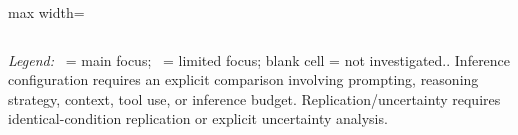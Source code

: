 \begin{table}[t]
\begin{adjustbox}{max width=\textwidth}
\begin{tabular}{@{}l*{11}{c}@{}}
\bottomrule
\end{tabular}
\end{adjustbox}

\vspace{0.5em}
\begin{minipage}{0.98\textwidth}
\footnotesize
\textit{Legend:}
\centralcov\ = main focus;
\secondarycov\ = limited focus;
blank cell = not investigated..
Inference configuration requires an explicit comparison involving prompting,
reasoning strategy, context, tool use, or inference budget.
Replication/uncertainty requires identical-condition replication or explicit
uncertainty analysis.
\end{minipage}
\end{table}